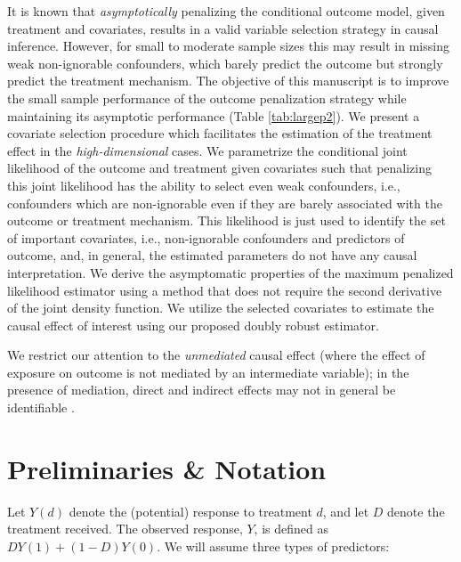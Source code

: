 \documentclass[11pt]{statsoc}
\begin{document}
It is known that {\it asymptotically} penalizing the conditional outcome model, given treatment and covariates, results in a valid variable selection strategy in causal inference. However, for small to moderate sample sizes this may result in missing weak non-ignorable confounders, which barely predict the outcome but strongly predict the treatment mechanism. The objective of this manuscript is to improve the small sample performance of the outcome penalization strategy while maintaining its asymptotic performance (Table \ref{tab:largep2}). We present a covariate selection procedure which facilitates the estimation of the treatment effect in the {\it high-dimensional} cases. We parametrize the conditional joint likelihood of the outcome and treatment given covariates such that penalizing this joint likelihood has the ability  to select even weak confounders, i.e., confounders which are non-ignorable even if they are barely associated with the outcome or treatment mechanism. This likelihood is just used to identify the set of important covariates, i.e., non-ignorable confounders and predictors of outcome,  and, in general, the estimated parameters do not have any causal interpretation. We derive the asymptomatic properties of the maximum penalized likelihood estimator using a method that does not require the second derivative of the joint density function.  We utilize the selected covariates to estimate the causal effect of interest using our proposed doubly robust estimator. 

We restrict our attention to the \textit{unmediated} causal effect (where the effect of exposure on outcome is not mediated by an intermediate variable); in the presence of mediation, direct and indirect effects may not in general be identifiable \citep{robins1992identifiability, petersen2006estimation, robins2010identification, hafeman2010alternative}.

\section{Preliminaries \& Notation} \label{sec:prelim}
Let $Y(d)$ denote the (potential) response to treatment $d$, and let $D$ denote the treatment received. The observed response, $Y$, is defined as $DY(1)+(1-D)Y(0)$. We will assume three types of predictors:
\end{document}
